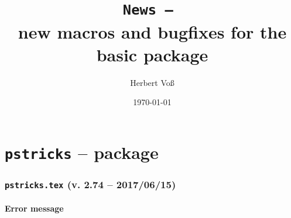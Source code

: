 \documentclass[11pt,english,BCOR=10mm,DIV=12,bibliography=totoc,parskip=false,headings=small,
    headinclude=false,footinclude=false,twoside]{pst-doc}
\begin{document}
\title{\texttt{News -- \the\year}\\ \Large new macros and bugfixes for the
basic package }
\author{Herbert Voß}
\date{\today}

\maketitle

\clearpage
\tableofcontents

\clearpage
\part{\texttt{pstricks} -- package}

\iffalse
\section{\texttt{pstricks.sty} -- \texttt{pstricks-pdf.sty}}
 
\section{\texttt{pstricks-pdf.sty}}
This package allows to use pstricks code with \Lprog{pdflatex} or \Lprog{lualatex}.
All optional arguments of package \LPack{auto-pst-pdf} are possible. In difference to
this package \LPack{pstricks-pdf} has no problems with running \Lprog{lualatex}.
Internally \Lprog{lualatex} starts \Lprog{xelatex} for creating the environments
\Lenv{pspicture} as single images.

\fi

\section{\texttt{pstricks.tex} (v. 2.74 -- 2017/06/15)}
\subsection{Error message}
\end{document}
